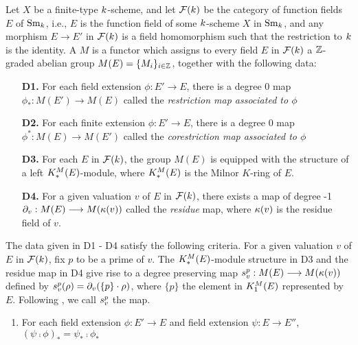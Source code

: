 \begin{defn}\label{def_pre_cycmod}
Let $X$ be a finite-type $k$-scheme, and let 
$\mathcal{F}(k)$ be the category of function fields $E$ of 
$\mathrm{Sm}_{k}$, i.e., $E$ is the function field of some $k$-scheme 
$X$ in $\mathrm{Sm}_{k}$, and any morphism $E \to E'$ in $\mathcal{F}(k)$
is a field homomorphism such that the restriction to $k$ 
is the identity. A  $M$ is a functor which 
assigns to every field $E$ in $\mathcal{F}(k)$ a $\mathbb{Z}$-graded abelian 
group $\displaystyle M(E) = \{M_i\}_{i \in \mathbb{Z}}$, together with
the following data:

\begin{enumerate}[label=\bfseries D\arabic*.]
\item[\textbf{D1.}] For each field extension $\phi: E' \to E$, 
there is a degree 0 map $\phi_*: M(E') \to M(E)$ called the 
\emph{restriction map associated to $\phi$}

\item[\textbf{D2.}] For each finite extension $\phi: E' \to E$, 
there is a degree 0 map $\phi^*: M(E) \to M(E')$ called the 
\emph{corestriction map associated to $\phi$}

\item[\textbf{D3.}] For each $E$ in $\mathcal{F}(k)$, the group $M(E)$ 
is equipped with the structure of a left $K^M_*(E)$-module, where
$K^M_*(E)$ is the Milnor $K$-ring of $E$.

\item[\textbf{D4.}] For a given valuation $v$ of $E$ in 
$\mathcal{F}(k)$, there exists a map of degree -1 $\partial_{v}: M(E) \longrightarrow 
M(\kappa(v))$ called the \emph{residue} map, where $\kappa(v)$ is 
the residue field of $v$.
\end{enumerate}

The data given in D1 - D4 satisfy the following criteria.
For a given valuation $v$ of $E$ in $\mathcal{F}(k)$,
fix $p$ to be a prime of $v$. The $K^M_*(E)$-module structure
in D3 and the residue map in D4 give
rise to a degree preserving map $s_{v}^{p} : M(E) \longrightarrow
M(\kappa(v))$ defined by $s_{v}^{p}(\rho) =
\partial_{v}(\{p\} \cdot \rho)$, where $\{p\}$ the element in 
$K^M_1(E)$ represented by $E$. Following \cite[1.1]{Rost96},
we call $s_{v}^{p}$ the  map.

\begin{enumerate}[label=\bfseries R1\alph*., leftmargin=3em]
\item For each field extension $\phi: E' \to E$ and 
field extension $\psi: E \to E''$, $(\psi \comp \phi)_* = \psi_* 
\comp \phi_*$


\end{enumerate}
\end{defn}

